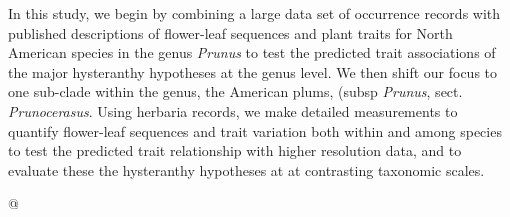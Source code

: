 \documentclass{article}\usepackage[]{graphicx}\usepackage[]{color}
\begin{document}
\noindent In this study, we begin by combining a large data set of occurrence records with published descriptions of flower-leaf sequences and plant traits for North American species in the genus \textit{Prunus} to test the predicted trait associations of the major hysteranthy hypotheses at the genus level. We then shift our focus to one sub-clade within the genus, the American plums, (subsp \textit{Prunus}, sect. \textit{Prunocerasus}. Using herbaria records, we make detailed measurements to quantify flower-leaf sequences and trait variation both within and among species to test the predicted trait relationship with higher resolution data, and to evaluate these the hysteranthy hypotheses at at contrasting taxonomic scales.

\noindent






@






\end{document}
